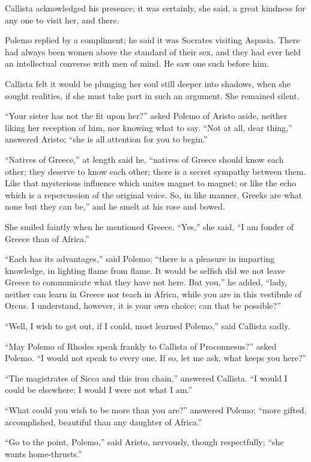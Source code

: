 Callista acknowledged his presence; it was certainly, she said, a
great kindness for any one to visit her, and there.

Polemo replied by a compliment; he said it was Socrates visiting
Aspasia. There had always been women above the standard of their sex,
and they had ever held an intellectual converse with men of mind. He
saw one such before him.

Callista felt it would be plunging her soul still deeper into
shadows, when she sought realities, if she must take part in such an
argument. She remained silent.

``Your sister has not the fit upon her?'' asked Polemo of
Aristo aside, neither liking her reception of him, nor knowing what to
say. ``Not at all, dear thing,'' answered Aristo; ``she is
all attention for you to begin.''

``Natives of Greece,'' at length said he, ``natives of
Greece should know each other; they deserve to know each other; there
is a secret sympathy between them. Like that mysterious influence
which unites magnet to magnet; or like the echo which is a
repercussion of the original voice. So, in like manner, Greeks are
what none but they can be,'' and he smelt at his rose and bowed.

She smiled faintly when he mentioned Greece. ``Yes,'' she
said, ``I am fonder of Greece than of Africa.''

``Each has its advantages,'' said Polemo; ``there is a
pleasure in imparting knowledge, in lighting flame from flame.
It would be selfish did we not leave Greece to communicate what they
have not here. But you,'' he added, ``lady, neither can learn
in Greece nor teach in Africa, while you are in this vestibule of
Orcus. I understand, however, it is your own choice; can that be
possible?''

``Well, I wish to get out, if I could, most learned Polemo,''
said Callista sadly.

``May Polemo of Rhodes speak frankly to Callista of Proconnesus?''
asked Polemo. ``I would not speak to every one. If so, let me ask,
what keeps you here?''

``The magistrates of Sicca and this iron chain,'' answered
Callista. ``I would I could be elsewhere; I would I were not what
I am.''

``What could you wish to be more than you are?'' answered
Polemo; ``more gifted, accomplished, beautiful than any daughter
of Africa.''

``Go to the point, Polemo,'' said Aristo, nervously, though
respectfully; ``she wants home-thrusts.''

